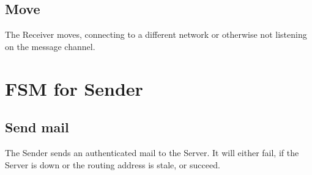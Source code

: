 \documentclass[11pt]{article}
\begin{document}
\subsection*{Move}
The Receiver moves, connecting to a different network or otherwise not
listening on the message channel.

\pagebreak

\section*{FSM for Sender}

\subsection*{Send mail}
The Sender sends an authenticated mail to the Server. It will either fail, if
the Server is down or the routing address is stale, or succeed.
\end{document}
